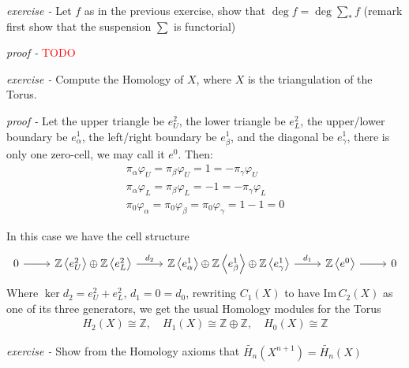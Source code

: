 \documentclass[11pt]{article}
\theoremstyle{definition}
\newcommand{\gen}[1]{\left\langle #1 \right\rangle}
\begin{document}
    \emph{exercise - }\label{HEx12} Let \(f\) as in the previous exercise, show that \(\deg f = \deg \sum_* f \) (remark first  show that the suspension \(\sum\) is functorial)

    \emph{proof - }\textcolor{red}{TODO}



    \emph{exercise - }\label{HEx13} Compute the Homology of \(X\), where \(X\) is the triangulation of the Torus.

    \emph{proof - } Let the upper triangle be \(e_U^2\), the lower triangle be \(e_L^2\), the upper/lower boundary be \(e_\alpha^1\), the left/right boundary be \(e_\beta^1\), and the diagonal be \(e_\gamma^1\), there is only one zero-cell, we may call it \(e^0\). Then:
    \begin{align*}
        \pi_\alpha \varphi_U = \pi_\beta \varphi_U = 1 = - \pi_\gamma \varphi_U \\
        \pi_\alpha \varphi_L = \pi_\beta \varphi_L = -1 = - \pi_\gamma \varphi_L \\
        \pi_0 \varphi_\alpha = \pi_0 \varphi_\beta = \pi_0 \varphi_\gamma = 1 - 1 = 0
    \end{align*}

    In this case we have the cell structure
    \begin{equation*}
        \begin{tikzcd}
            0 \arrow[r] & \mathbb{Z}\gen{e^2_U} \oplus \mathbb{Z}\gen{e^2_L} \arrow[r,"{d_2}"] & \mathbb{Z} \gen{e^1_\alpha} \oplus \mathbb{Z} \gen{e^1_\beta} \oplus \mathbb{Z} \gen{e^1_\gamma} \arrow[r,"{d_1}"] &\mathbb{Z} \gen{e^0} \arrow[r] & 0
        \end{tikzcd}
    \end{equation*}
    Where \(\ker d_2 = e_U^2 + e_L^2\), \(d_1 = 0 = d_0\), rewriting \(C_1(X)\) to have \(\text{Im}\,C_2(X)\) as one of its three generators, we get the usual Homology modules for the Torus
    \begin{align*}
        H_2(X) \cong \mathbb{Z}, \quad H_1(X) \cong \mathbb{Z} \oplus \mathbb{Z}, \quad H_0(X) \cong \mathbb{Z}
    \end{align*}



    \emph{exercise - }\label{HEx14} Show from the Homology axioms that \(\tilde{H_n}(X^{n+1}) = \tilde{H_n}(X)\)
\end{document}
